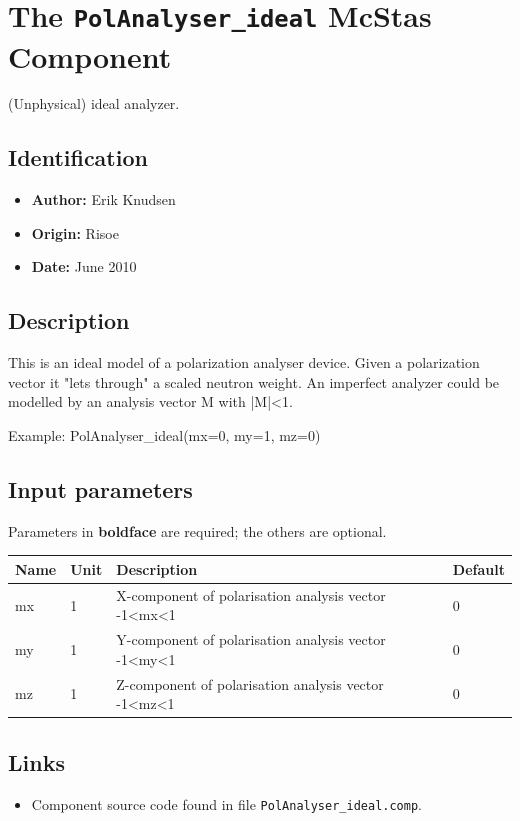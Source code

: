 \section{The \texttt{PolAnalyser\_ideal} McStas Component}
(Unphysical) ideal analyzer.

\subsection*{Identification}
\begin{itemize}
  \item \textbf{Author:} Erik Knudsen
  \item \textbf{Origin:} Risoe
  \item \textbf{Date:} June 2010
\end{itemize}

\subsection*{Description}
This is an ideal model of a polarization analyser device. Given a polarization vector it "lets through" a scaled neutron weight. An imperfect analyzer could be modelled by an analysis vector M with |M|\textless{}1.

Example: PolAnalyser\_ideal(mx=0, my=1, mz=0)

\subsection*{Input parameters}
Parameters in \textbf{boldface} are required; the others are optional.

\begin{longtable}{p{}p{}p{}p{}}
\toprule
\textbf{Name} & \textbf{Unit} & \textbf{Description} & \textbf{Default} \\
\midrule
\endhead
mx & 1 & X-component of polarisation analysis vector -1\textless{}mx\textless{}1 & 0 \\
my & 1 & Y-component of polarisation analysis vector -1\textless{}my\textless{}1 & 0 \\
mz & 1 & Z-component of polarisation analysis vector -1\textless{}mz\textless{}1 & 0 \\
\bottomrule
\end{longtable}

\subsection*{Links}
\begin{itemize}
  \item Component source code found in file \texttt{PolAnalyser\_ideal.comp}.
\end{itemize}
